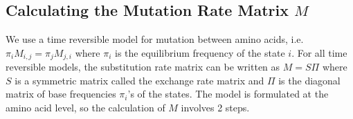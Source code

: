 \documentclass[13pt]{article}
\newcommand{\Qmat}{\ensuremath{\mathbf{Q}}\xspace}
\begin{document}


\subsection*{Calculating the Mutation Rate Matrix $M$}
We use a time reversible model for mutation between amino acids, i.e. $\pi_i M_{i,j} = \pi_j M_{j,i}$ where $\pi_i$ is the equilibrium frequency of the state $i$.
For all time reversible models, the substitution rate matrix can be written as $M=S\Pi$ where $S$ is a symmetric matrix called the exchange rate matrix and $\Pi$ is the diagonal matrix of base frequencies $\pi_i$'s of the states. The model is formulated at the amino acid level, so the calculation of $M$ involves 2 steps.
\end{document}
